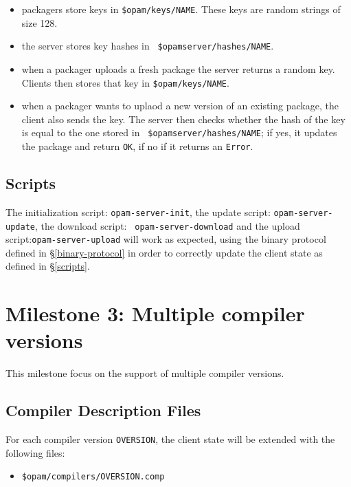 \documentclass[a4paper,11pt]{article}
\begin{document}
\begin{itemize}

\item packagers store keys in {\tt \$opam/keys/NAME}. These keys are
  random strings of size 128.

\item the server stores key hashes in {\tt
  \$opamserver/hashes/NAME}.

\item when a packager uploads a fresh package the server returns a
  random key. Clients then stores that key in {\tt \$opam/keys/NAME}.

\item when a packager wants to uplaod a new version of an existing
  package, the client also sends the key. The server then checks
  whether the hash of the key is equal to the one stored in {\tt
    \$opamserver/hashes/NAME}; if yes, it updates the
  package and return {\tt OK}, if no if it returns an {\tt Error}.

\end{itemize}

\subsection{Scripts}

The initialization script: {\tt opam-server-init}, the update script:
{\tt opam-server-update}, the download script: {\tt
  opam-server-download} and the upload script:{\tt opam-server-upload} will work as
expected, using the binary protocol defined in
\S\ref{binary-protocol} in order to correctly update the client state as
defined in \S\ref{scripts}.


\section{Milestone 3: Multiple compiler versions}

This milestone focus on the support of multiple compiler versions.

\subsection{Compiler Description Files}

For each compiler version {\tt OVERSION}, the client state will be
extended with the following files:

\begin{itemize}
\item {\tt \$opam/compilers/OVERSION.comp}
\end{itemize}
\end{document}
